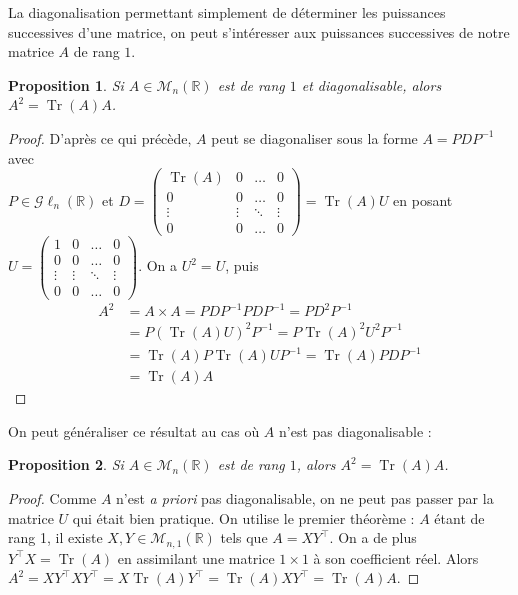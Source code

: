 \documentclass[a4paper]{article}
\newtheorem*{proposition}{Proposition}
\begin{document}
La diagonalisation permettant simplement de déterminer les puissances successives d'une matrice, on peut s'intéresser aux puissances successives de notre matrice $A$ de rang $1$.

\begin{proposition}
    Si $A \in \mathcal{M}_{n}(\mathbb{R})$ est de rang $1$ et diagonalisable, alors $A^2 = \operatorname{Tr}(A)A$.
\end{proposition}

\begin{proof}
    D'après ce qui précède, $A$ peut se diagonaliser sous la forme $A = PDP^{-1}$ avec\\ $P \in \mathcal{G}\ell_n(\mathbb{R})$ et $D = \begin{pmatrix} \operatorname{Tr}(A) & 0 & \dots & 0 \\ 0 & 0 & \dots & 0 \\ \vdots & \vdots & \ddots & \vdots \\ 0 & 0 & \dots & 0\end{pmatrix} = \operatorname{Tr}(A) U$ en posant $U = \begin{pmatrix} 1 & 0 & \dots & 0 \\ 0 & 0 & \dots & 0 \\ \vdots & \vdots & \ddots & \vdots \\ 0 & 0 & \dots & 0\end{pmatrix}$. On a $U^2 = U$, puis 
    \begin{align*}
        A^2 &= A \times A = PDP^{-1}PDP^{-1} = PD^2P^{-1} \\
        &= P\left(\operatorname{Tr}(A)U\right)^2P^{-1} = P\operatorname{Tr}(A)^2U^2P^{-1} \\
        &= \operatorname{Tr}(A)P\operatorname{Tr}(A)UP^{-1} =  \operatorname{Tr}(A)PDP^{-1} \\
        &= \operatorname{Tr}(A)A
    \end{align*}
\end{proof}

On peut généraliser ce résultat au cas où $A$ n'est pas diagonalisable :

\begin{proposition}
    Si $A \in \mathcal{M}_{n}(\mathbb{R})$ est de rang $1$, alors $A^2 = \operatorname{Tr}(A)A$.
\end{proposition}

\begin{proof}
    Comme $A$ n'est \emph{a priori} pas diagonalisable, on ne peut pas passer par la matrice $U$ qui était bien pratique. On utilise le premier théorème : $A$ étant de rang 1, il existe $X, Y \in \mathcal{M}_{n, 1}(\mathbb{R})$ tels que $A = XY^\top$. On a de plus $Y^\top X = \operatorname{Tr}(A)$ en assimilant une matrice $1\times1$ à son coefficient réel. Alors $A^2 = XY^\top XY^\top = X\operatorname{Tr}(A)Y^\top = \operatorname{Tr}(A)XY^\top = \operatorname{Tr}(A)A$.
\end{proof}
\end{document}
